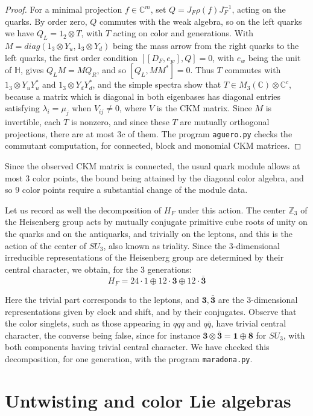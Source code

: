 \documentclass[11pt]{amsart}
\theoremstyle{definition}
\begin{document}
\begin{proof}
For a minimal projection $f\in\mathbb C^m$, set $Q=J_F\rho(f)J_F^{-1}$, acting on the quarks. By order zero, $Q$ commutes with the weak algebra, so on the left quarks we have $Q_L=1_2\otimes T$, with $T$ acting on color and generations. With $M=diag(1_3\otimes Y_u,1_3\otimes Y_d)$ being the mass arrow from the right quarks to the left quarks, the first order condition $[[D_F,e_w],Q]=0$, with $e_w$ being the unit of $\mathbb H$, gives $Q_LM=MQ_R$, and so $[Q_L,MM^*]=0$. Thus $T$ commutes with $1_3\otimes Y_uY_u^*$ and $1_3\otimes Y_dY_d^*$, and the simple spectra show that $T\in M_3(\mathbb C)\otimes\mathbb C^c$, because a matrix which is diagonal in both eigenbases has diagonal entries satisfying $\lambda_i=\mu_j$ when $V_{ij}\neq0$, where $V$ is the CKM matrix. Since $M$ is invertible, each $T$ is nonzero, and since these $T$ are mutually orthogonal projections, there are at most $3c$ of them. The program {\tt aguero.py} checks the commutant computation, for connected, block and monomial CKM matrices.
\end{proof}

Since the observed CKM matrix is connected, the usual quark module allows at most 3 color points, the bound being attained by the diagonal color algebra, and so 9 color points require a substantial change of the module data.

Let us record as well the decomposition of $H_F$ under this action. The center $\mathbb Z_3$ of the Heisenberg group acts by mutually conjugate primitive cube roots of unity on the quarks and on the antiquarks, and trivially on the leptons, and this is the action of the center of $SU_3$, also known as triality. Since the 3-dimensional irreducible representations of the Heisenberg group are determined by their central character, we obtain, for the 3 generations:
$$H_F=24\cdot1\oplus12\cdot\mathbf 3\oplus12\cdot\bar{\mathbf 3}$$

Here the trivial part corresponds to the leptons, and $\mathbf 3,\bar{\mathbf 3}$ are the 3-dimensional representations given by clock and shift, and by their conjugates. Observe that the color singlets, such as those appearing in $qqq$ and $q\bar{q}$, have trivial central character, the converse being false, since for instance $\mathbf 3\otimes\bar{\mathbf 3}=\mathbf 1\oplus\mathbf 8$ for $SU_3$, with both components having trivial central character. We have checked this decomposition, for one generation, with the program {\tt maradona.py}.

\section{Untwisting and color Lie algebras}
\end{document}
